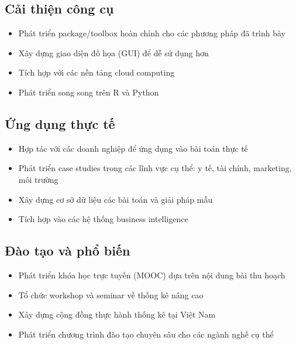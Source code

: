 \subsection*{Cải thiện công cụ}
\begin{itemize}
    \item Phát triển package/toolbox hoàn chỉnh cho các phương pháp đã trình bày
    
    \item Xây dựng giao diện đồ họa (GUI) để dễ sử dụng hơn
    
    \item Tích hợp với các nền tảng cloud computing
    
    \item Phát triển song song trên R và Python
\end{itemize}

\subsection*{Ứng dụng thực tế}
\begin{itemize}
    \item Hợp tác với các doanh nghiệp để ứng dụng vào bài toán thực tế
    
    \item Phát triển case studies trong các lĩnh vực cụ thể: y tế, tài chính, marketing, môi trường
    
    \item Xây dựng cơ sở dữ liệu các bài toán và giải pháp mẫu
    
    \item Tích hợp vào các hệ thống business intelligence
\end{itemize}

\subsection*{Đào tạo và phổ biến}
\begin{itemize}
    \item Phát triển khóa học trực tuyến (MOOC) dựa trên nội dung bài thu hoạch
    
    \item Tổ chức workshop và seminar về thống kê nâng cao
    
    \item Xây dựng cộng đồng thực hành thống kê tại Việt Nam
    
    \item Phát triển chương trình đào tạo chuyên sâu cho các ngành nghề cụ thể
\end{itemize}

